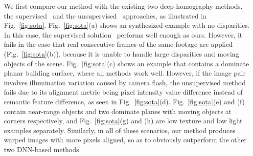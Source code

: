 \documentclass[runningheads]{llncs}
\begin{document}
We first compare our method with the existing two deep homography methods, the supervised~\cite{detone2016deep} and the unsupervised~\cite{nguyen2018unsupervised} approaches, as illustrated in Fig.~\ref{fig:sota}. Fig.~\ref{fig:sota}(a) shows an synthesized example with no disparities. In this case, the supervised solution~\cite{detone2016deep} performs well enough as ours. However, it fails in the case that real consecutive frames of the same footage are applied (Fig.~\ref{fig:sota}(b)), because it is unable to handle large disparities and moving objects of the scene. Fig.~\ref{fig:sota}(c) shows an example that contains a dominate planar building surface, where all methods work well. However, if the image pair involves illumination variation caused by camera flash, the unsupervised method~\cite{nguyen2018unsupervised} fails due to its alignment metric being pixel intensity value difference instead of semantic feature difference, as seen in Fig.~\ref{fig:sota}(d). Fig.~\ref{fig:sota}(e) and (f) contain near-range objects and two dominate planes with moving objects at corners respectively, and Fig.~\ref{fig:sota}(g) and (h) are low texture and low light examples separately. Similarly, in all of these scenarios, our method produces warped images with more pixels aligned, so as to obviously outperform the other two DNN-based methods.
\end{document}
